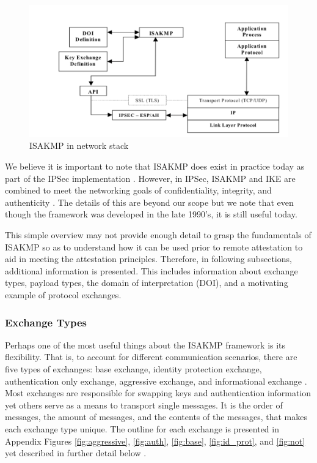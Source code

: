 \documentclass[12pt, letterpaper, twoside]{article}
\begin{document}
\begin{figure}[hbtp]
  \begin{center}
    \includegraphics[scale=0.55]{stack} 
    \caption{ISAKMP in network stack \cite{handshake}}
    \label{stack}
  \end{center}
\end{figure}

We believe it is important to note that ISAKMP does exist in practice today as part of the IPSec implementation \cite{securing, design_IPsec}. However, in IPSec, ISAKMP and IKE are combined to meet the networking goals of confidentiality, integrity, and authenticity \cite{IKE_RFC}. The details of this are beyond our scope but we note that even though the framework was developed in the late 1990's, it is still useful today.

This simple overview may not provide enough detail to grasp the fundamentals of ISAKMP so as to understand how it can be used prior to remote attestation to aid in meeting the attestation principles. Therefore, in following subsections, additional information is presented. This includes information about exchange types, payload types, the domain of interpretation (DOI), and a motivating example of protocol exchanges. 

\subsubsection{Exchange Types}

Perhaps one of the most useful things about the ISAKMP framework is its flexibility. That is, to account for different communication scenarios, there are five types of exchanges: base exchange, identity protection exchange, authentication only exchange, aggressive exchange, and informational exchange \cite{ISAKMP}. Most exchanges are responsible for swapping keys and authentication information yet others serve as a means to transport single messages. It is the order of messages, the amount of messages, and the contents of the messages, that makes each exchange type unique. The outline for each exchange is presented in Appendix Figures \ref{fig:aggressive}, \ref{fig:auth}, \ref{fig:base}, \ref{fig:id_prot}, and \ref{fig:not} yet described in further detail below \cite{ISAKMP}. 
\end{document}

